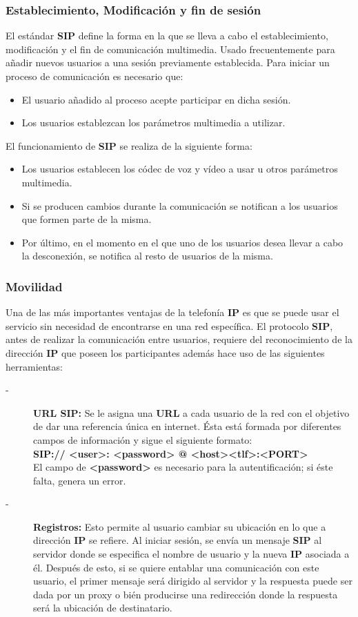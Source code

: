 \documentclass[a4paper, 11pt]{article} %
\begin{document}
		\subsubsection{Establecimiento, Modificación y fin de sesión}
		El estándar \textbf{SIP} define la forma en la que se lleva a cabo el establecimiento, modificación y el fin de comunicación multimedia. Usado frecuentemente para añadir nuevos usuarios a una sesión previamente establecida. Para iniciar un proceso de comunicación es necesario que:
		\begin{itemize}
			\item El usuario añadido al proceso acepte participar en dicha sesión.
			\item Los usuarios establezcan los parámetros multimedia a utilizar.
		\end{itemize}
		El funcionamiento de \textbf{SIP} se realiza de la siguiente forma:
		\begin{itemize}
			\item Los usuarios establecen los códec de voz y vídeo a usar u otros parámetros multimedia.
			\item Si se producen cambios durante la comunicación se notifican a los usuarios que formen parte de la misma.
			\item Por último, en el momento en el que uno de los usuarios desea llevar a cabo la desconexión, se notifica al resto de usuarios de la misma.
		\end{itemize}				
		
		\subsubsection{Movilidad}
		Una de las más importantes ventajas de la telefonía \textbf{IP} es que se puede usar el servicio sin necesidad de encontrarse en una red específica. El protocolo \textbf{SIP}, antes de realizar la comunicación entre usuarios, requiere del reconocimiento de la dirección \textbf{IP} que poseen los participantes además hace uso de las siguientes herramientas:
		\begin{description}
			\item[-]\textbf{URL SIP:} Se le asigna una \textbf{URL} a cada usuario de la red con el objetivo de dar una referencia única en internet. Ésta está formada por diferentes campos de información y sigue el siguiente formato:\\
			\textbf{SIP:// <user>: <password> @ <host><tlf>:<PORT>}\\
			El campo de \textbf{<password>} es necesario para la autentificación; si éste falta, genera un error.
			\item[-]\textbf{Registros:} Esto permite al usuario cambiar su ubicación en lo que a dirección \textbf{IP} se refiere. Al iniciar sesión, se envía un mensaje \textbf{SIP} al servidor donde se especifica el nombre de usuario y la nueva \textbf{IP} asociada a él. Después de esto, si se quiere entablar una comunicación con este usuario, el primer mensaje será dirigido al servidor y la respuesta puede ser dada por un proxy o bién producirse una redirección donde la respuesta será la ubicación de destinatario.
		\end{description}
	
\end{document}
